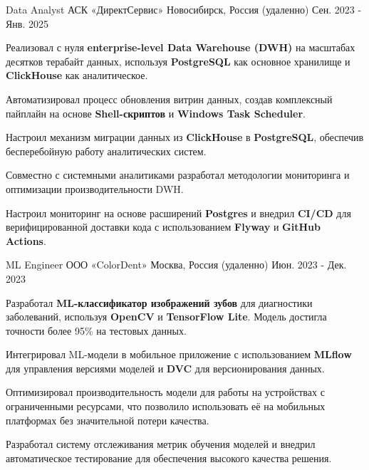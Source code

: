 \begin{cventries}
  \cventry
    {Data Analyst} %
    {АСК «ДиректСервис»} %
    {Новосибирск, Россия (удаленно)} %
    {Сен. 2023 - Янв. 2025} %
    {
      \begin{cvitems}
        \item {Реализовал с нуля \textbf{enterprise-level Data Warehouse (DWH)} на масштабах десятков терабайт данных, используя \textbf{PostgreSQL} как основное хранилище и \textbf{ClickHouse} как аналитическое.}
        \item {Автоматизировал процесс обновления витрин данных, создав комплексный пайплайн на основе \textbf{Shell-скриптов} и \textbf{Windows Task Scheduler}.}
        \item {Настроил механизм миграции данных из \textbf{ClickHouse} в \textbf{PostgreSQL}, обеспечив бесперебойную работу аналитических систем.}
        \item {Совместно с системными аналитиками разработал методологии мониторинга и оптимизации производительности DWH.}
        \item {Настроил мониторинг на основе расширений \textbf{Postgres} и внедрил \textbf{CI/CD} для верифицированной доставки кода с использованием \textbf{Flyway} и \textbf{GitHub Actions}.}
      \end{cvitems}
    }


  \cventry
    {ML Engineer} %
    {ООО «ColorDent»} %
    {Москва, Россия (удаленно)} %
    {Июн. 2023 - Дек. 2023} %
    {
      \begin{cvitems}
        \item {Разработал \textbf{ML-классификатор изображений зубов} для диагностики заболеваний, используя \textbf{OpenCV} и \textbf{TensorFlow Lite}. Модель достигла точности более 95\% на тестовых данных.}
        \item {Интегрировал ML-модели в мобильное приложение с использованием \textbf{MLflow} для управления версиями моделей и \textbf{DVC} для версионирования данных.}
        \item {Оптимизировал производительность модели для работы на устройствах с ограниченными ресурсами, что позволило использовать её на мобильных платформах без значительной потери качества.}
        \item {Разработал систему отслеживания метрик обучения моделей и внедрил автоматическое тестирование для обеспечения высокого качества решения.}
      \end{cvitems}
    }


\end{cventries}


